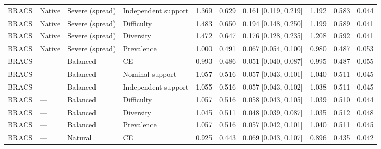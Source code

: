 \begin{longtable}{llllllllll}
BRACS & Native & Severe (spread) & Independent support & 1.369 & 0.629 & 0.161 [0.119, 0.219] & 1.192 & 0.583 & 0.044 \\
BRACS & Native & Severe (spread) & Difficulty & 1.483 & 0.650 & 0.194 [0.148, 0.250] & 1.199 & 0.589 & 0.041 \\
BRACS & Native & Severe (spread) & Diversity & 1.472 & 0.647 & 0.176 [0.128, 0.235] & 1.208 & 0.592 & 0.041 \\
BRACS & Native & Severe (spread) & Prevalence & 1.000 & 0.491 & 0.067 [0.054, 0.100] & 0.980 & 0.487 & 0.053 \\
BRACS & --- & Balanced & CE & 0.993 & 0.486 & 0.051 [0.040, 0.087] & 0.995 & 0.487 & 0.055 \\
BRACS & --- & Balanced & Nominal support & 1.057 & 0.516 & 0.057 [0.043, 0.101] & 1.040 & 0.511 & 0.045 \\
BRACS & --- & Balanced & Independent support & 1.055 & 0.516 & 0.057 [0.043, 0.102] & 1.038 & 0.511 & 0.045 \\
BRACS & --- & Balanced & Difficulty & 1.057 & 0.516 & 0.058 [0.043, 0.105] & 1.039 & 0.510 & 0.044 \\
BRACS & --- & Balanced & Diversity & 1.045 & 0.511 & 0.048 [0.039, 0.087] & 1.035 & 0.512 & 0.048 \\
BRACS & --- & Balanced & Prevalence & 1.057 & 0.516 & 0.057 [0.042, 0.101] & 1.040 & 0.511 & 0.045 \\
BRACS & --- & Natural & CE & 0.925 & 0.443 & 0.069 [0.043, 0.107] & 0.896 & 0.435 & 0.042 \\
\end{longtable}
